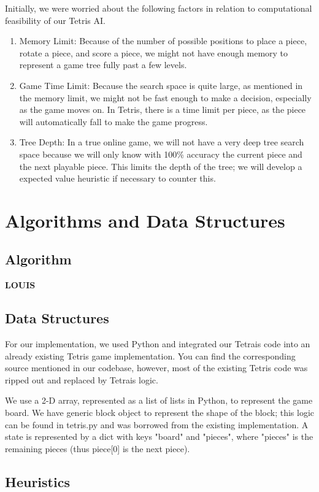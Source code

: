 \documentclass[12pt]{article}
\begin{document}
Initially, we were worried about the following factors in relation to computational feasibility of our Tetris AI.
\begin{enumerate}
\item Memory Limit: Because of the number of possible positions to place a piece, rotate a piece, and score a piece, we might not have enough memory to represent a game tree fully past a few levels.
\item Game Time Limit: Because the search space is quite large, as mentioned in the memory limit, we might not be fast enough to make a decision, especially as the game moves on. In Tetris, there is a time limit per piece, as the piece will automatically fall to make the game progress.
\item Tree Depth: In a true online game, we will not have a very deep tree search space because we will only know with 100\% accuracy the current piece and the next playable piece. This limits the depth of the tree; we will develop a expected value heuristic if necessary to counter this.
\end{enumerate}


\section{Algorithms and Data Structures}
\subsection{Algorithm}
\textbf{LOUIS}

\subsection{Data Structures}
For our implementation, we used Python and integrated our Tetrais code into an already existing Tetris game implementation. You can find the corresponding source mentioned in our codebase, however, most of the existing Tetris code was ripped out and replaced by Tetrais logic. 

We use a 2-D array, represented as a list of lists in Python, to represent the game board. We have generic block object to represent the shape of the block; this logic can be found in tetris.py and was borrowed from the existing implementation. A state is represented by a dict with keys "board" and "pieces", where "pieces" is the remaining pieces (thus piece[0] is the next piece).

\subsection{Heuristics}
\end{document}
